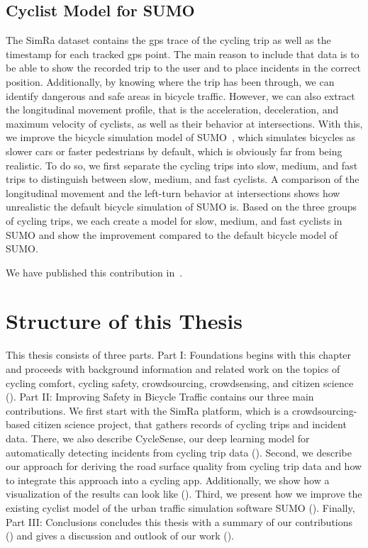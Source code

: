 \subsection{Cyclist Model for SUMO}
\label{subsec:sumo_contribution}
The SimRa dataset contains the \ac{gps} trace of the cycling trip as well as the timestamp for each tracked \ac{gps} point.
The main reason to include that data is to be able to show the recorded trip to the user and to place incidents in the correct position.
Additionally, by knowing where the trip has been through, we can identify dangerous and safe areas in bicycle traffic.
However, we can also extract the longitudinal movement profile, that is the acceleration, deceleration, and maximum velocity of cyclists, as well as their behavior at intersections.
With this, we improve the bicycle simulation model of SUMO~\cite{lopez2018microscopic}, which simulates bicycles as slower cars or faster pedestrians by default, which is obviously far from being realistic.
To do so, we first separate the cycling trips into slow, medium, and fast trips to distinguish between slow, medium, and fast cyclists.
A comparison of the longitudinal movement and the left-turn behavior at intersections shows how unrealistic the default bicycle simulation of SUMO is.
Based on the three groups of cycling trips, we each create a model for slow, medium, and fast cyclists in SUMO and show the improvement compared to the default bicycle model of SUMO.

We have published this contribution in~\cite{karakaya2022realistic,karakaya2023achieving}.

\section{Structure of this Thesis}
\label{sec:structure}

This thesis consists of three parts.
Part I: Foundations begins with this chapter and proceeds with background information and related work on the topics of cycling comfort, cycling safety, crowdsourcing, crowdsensing, and citizen science ().
Part II: Improving Safety in Bicycle Traffic contains our three main contributions.
We first start with the SimRa platform, which is a crowdsourcing-based citizen science project, that gathers records of cycling trips and incident data.
There, we also describe CycleSense, our deep learning model for automatically detecting incidents from cycling trip data ().
Second, we describe our approach for deriving the road surface quality from cycling trip data and how to integrate this approach into a cycling app.
Additionally, we show how a visualization of the results can look like ().
Third, we present how we improve the existing cyclist model of the urban traffic simulation software SUMO ().
Finally, Part III: Conclusions concludes this thesis with a summary of our contributions () and gives a discussion and outlook of our work ().
